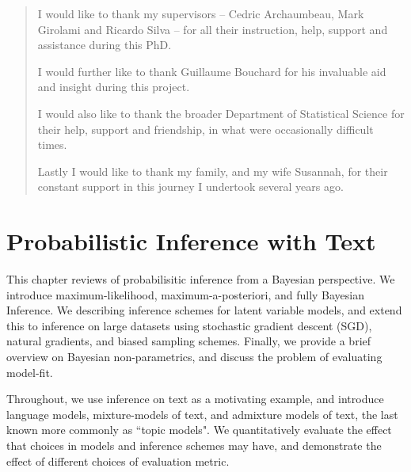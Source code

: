 \begin{abstract}
I would like to thank my supervisors -- Cedric Archaumbeau, Mark Girolami and Ricardo Silva -- for all their instruction, help, support and assistance during this PhD.

I would further like to thank Guillaume Bouchard for his invaluable aid and insight during this project.

I would also like to thank the broader Department of Statistical Science for their help, support and friendship, in what were occasionally difficult times.

Lastly I would like to thank my family, and my wife Susannah, for their constant support in this journey I undertook several years ago.
\end{abstract}
\clearpage 
\tableofcontents
\listoffigures
\listoftables

\clearpage
\clearpage
\clearpage
\clearpage

\clearpage




\newcommand \xdn  { { \vv{x}_{dn} } }
\newcommand \zd   { { \vv{z}_d } }
\newcommand \qfam { { \mathcal{Q} } }
\newcommand \xdat { { \mathcal{X} } }
\newcommand \zdat { { \mathcal{Z} } }
\newcommand \xnew { { \vv{x}^{*} } }
\newcommand \znew { { \vv{z}^{*} } }
\newcommand \param { { \vv{\phi} } }
\newcommand \params { { \Phi } }
\newcommand \ml[1] { { {#1}_{\text{ML}} } } 
\newcommand \map[1] { { {#1}_{\text{MAP}} } } 
\newcommand \quarter { { \oneover{4} } }
\newcommand \eighth { { \oneover{8} } }
\newcommand \fqt[1] { { \mathcal{F}\left( {#1} \right) } }
\newcommand \joint { { p(\xdat, \zdat | \params) } }
\newcommand \logjoint { { \ln \joint } }
\newcommand \exlogjoint[1] { { \ex{\logjoint}{{#1}} } }

\chapter{Probabilistic Inference with Text}
This chapter reviews of probabilisitic inference from a Bayesian perspective. We introduce maximum-likelihood, maximum-a-posteriori, and fully Bayesian Inference. We describing inference schemes for latent variable models, and extend this to inference on large datasets using stochastic gradient descent (SGD), natural gradients, and biased sampling schemes. Finally, we provide a brief overview on Bayesian non-parametrics, and discuss the problem of evaluating model-fit.

Throughout, we use inference on text as a motivating example, and introduce language models, mixture-models of text, and admixture models of text, the last known more commonly as ``topic models". We quantitatively evaluate the effect that choices in models and inference schemes may have, and demonstrate the effect of different choices of evaluation metric.
